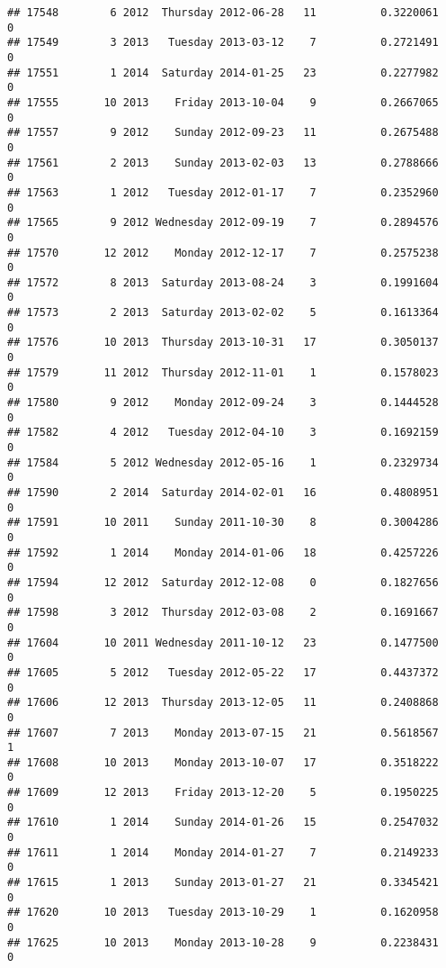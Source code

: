 \documentclass[
]{article}
\begin{document}
\begin{verbatim}
## 17548        6 2012  Thursday 2012-06-28   11          0.3220061             0
## 17549        3 2013   Tuesday 2013-03-12    7          0.2721491             0
## 17551        1 2014  Saturday 2014-01-25   23          0.2277982             0
## 17555       10 2013    Friday 2013-10-04    9          0.2667065             0
## 17557        9 2012    Sunday 2012-09-23   11          0.2675488             0
## 17561        2 2013    Sunday 2013-02-03   13          0.2788666             0
## 17563        1 2012   Tuesday 2012-01-17    7          0.2352960             0
## 17565        9 2012 Wednesday 2012-09-19    7          0.2894576             0
## 17570       12 2012    Monday 2012-12-17    7          0.2575238             0
## 17572        8 2013  Saturday 2013-08-24    3          0.1991604             0
## 17573        2 2013  Saturday 2013-02-02    5          0.1613364             0
## 17576       10 2013  Thursday 2013-10-31   17          0.3050137             0
## 17579       11 2012  Thursday 2012-11-01    1          0.1578023             0
## 17580        9 2012    Monday 2012-09-24    3          0.1444528             0
## 17582        4 2012   Tuesday 2012-04-10    3          0.1692159             0
## 17584        5 2012 Wednesday 2012-05-16    1          0.2329734             0
## 17590        2 2014  Saturday 2014-02-01   16          0.4808951             0
## 17591       10 2011    Sunday 2011-10-30    8          0.3004286             0
## 17592        1 2014    Monday 2014-01-06   18          0.4257226             0
## 17594       12 2012  Saturday 2012-12-08    0          0.1827656             0
## 17598        3 2012  Thursday 2012-03-08    2          0.1691667             0
## 17604       10 2011 Wednesday 2011-10-12   23          0.1477500             0
## 17605        5 2012   Tuesday 2012-05-22   17          0.4437372             0
## 17606       12 2013  Thursday 2013-12-05   11          0.2408868             0
## 17607        7 2013    Monday 2013-07-15   21          0.5618567             1
## 17608       10 2013    Monday 2013-10-07   17          0.3518222             0
## 17609       12 2013    Friday 2013-12-20    5          0.1950225             0
## 17610        1 2014    Sunday 2014-01-26   15          0.2547032             0
## 17611        1 2014    Monday 2014-01-27    7          0.2149233             0
## 17615        1 2013    Sunday 2013-01-27   21          0.3345421             0
## 17620       10 2013   Tuesday 2013-10-29    1          0.1620958             0
## 17625       10 2013    Monday 2013-10-28    9          0.2238431             0

\end{verbatim}
\end{document}
